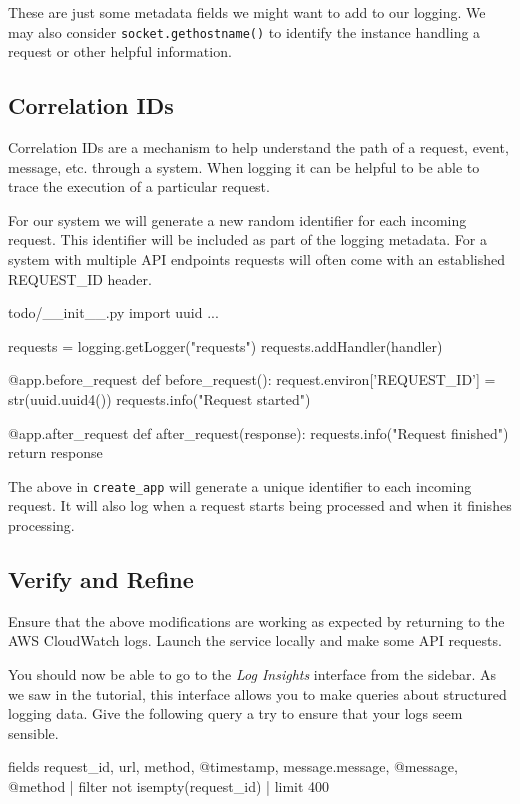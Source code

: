 \documentclass{csse4400}
\begin{document}
These are just some metadata fields we might want to add to our logging.
We may also consider \texttt{socket.gethostname()} to identify the instance handling a request or other helpful information.

\subsection{Correlation IDs}

Correlation IDs are a mechanism to help understand the path of a request, event, message, etc. through a system.
When logging it can be helpful to be able to trace the execution of a particular request.

For our system we will generate a new random identifier for each incoming request.
This identifier will be included as part of the logging metadata.
For a system with multiple API endpoints requests will often come with an established REQUEST\_ID header.

\begin{code}[language=python,numbers=none]{todo/\_\_init\_\_.py}
import uuid
...

requests = logging.getLogger("requests")
requests.addHandler(handler)

@app.before_request
def before_request():
   request.environ['REQUEST_ID'] = str(uuid.uuid4())
   requests.info("Request started")

@app.after_request
def after_request(response):
   requests.info("Request finished")
   return response
\end{code}

The above in \texttt{create\_app} will generate a unique identifier to each incoming request.
It will also log when a request starts being processed and when it finishes processing.


\subsection{Verify and Refine}
Ensure that the above modifications are working as expected by returning to the AWS CloudWatch logs.
Launch the service locally and make some API requests.

You should now be able to go to the \textsl{Log Insights} interface from the sidebar.
As we saw in the tutorial,
this interface allows you to make queries about structured logging data.
Give the following query a try to ensure that your logs seem sensible.

\begin{code}[numbers=none]{}
fields request_id, url, method, @timestamp, message.message, @message, @method
| filter not isempty(request_id)
| limit 400
\end{code}
\end{document}

